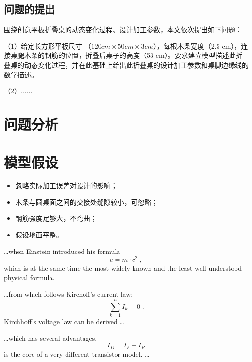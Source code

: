 \documentclass[withoutpreface,bwprint]{cumcmthesis} %
\begin{document}
\subsection{问题的提出}

围绕创意平板折叠桌的动态变化过程、设计加工参数，本文依次提出如下问题：

（1）给定长方形平板尺寸 （$120 cm \times 50 cm \times 3 cm$），每根木条宽度（2.5 cm），连接桌腿木条的钢筋的位置，折叠后桌子的高度（53 cm）。要求建立模型描述此折叠桌的动态变化过程，并在此基础上给出此折叠桌的设计加工参数和桌脚边缘线的数学描述。\label{my_label1}

（2）......


\section{问题分析}



\section{模型假设}

\begin{itemize}
\item 忽略实际加工误差对设计的影响；
\item 木条与圆桌面之间的交接处缝隙较小，可忽略；
\item 钢筋强度足够大，不弯曲；
\item 假设地面平整。
\end{itemize}

\ldots when Einstein introduced his formula
\begin{equation}
e = m \cdot c^2 \; ,
\end{equation}
which is at the same time the most widely known
and the least well understood physical formula.

\ldots from which follows Kirchoff's current law:
\begin{equation}
\sum_{k=1}^{n} I_k = 0 \; .
\end{equation}
Kirchhoff's voltage law can be derived \ldots

\ldots which has several advantages.
\begin{equation}
\label{eq:01}
I_D = I_F - I_R
\end{equation}
is the core of a very different transistor model. \ldots
\end{document}
